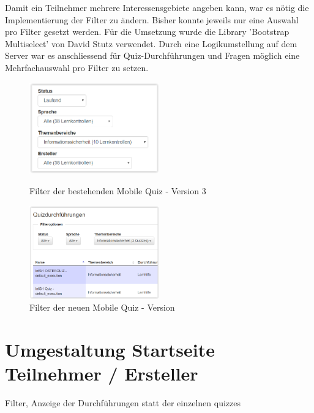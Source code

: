 \bigskip

Damit ein Teilnehmer mehrere Interessensgebiete angeben kann, war es nötig die Implementierung der Filter zu ändern. Bisher konnte jeweils nur eine Auswahl pro Filter gesetzt werden. Für die Umsetzung wurde die Library 'Bootstrap Multiselect' \cite{bootstrap_multiselect} von David Stutz verwendet. Durch eine Logikumstellung auf dem Server war es anschliessend für Quiz-Durchführungen und Fragen möglich eine Mehrfachauswahl pro Filter zu setzen.

\begin{figure}[H]
	\centering
	\includegraphics[width=0.5\textwidth]{Images/Alte_Filter_Mobile_Quiz.PNG}
	\caption{Filter der bestehenden Mobile Quiz - Version 3}
	\cite{mobilequiz.ch}
\end{figure}

\begin{figure}[H]
	\centering
	\includegraphics[width=0.5\textwidth]{Images/Neue_Filter_Mobile_Quiz.PNG}
	\caption{Filter der neuen Mobile Quiz - Version}
\end{figure}



\section{Umgestaltung Startseite Teilnehmer / Ersteller}
Filter, Anzeige der Durchführungen statt der einzelnen quizzes



